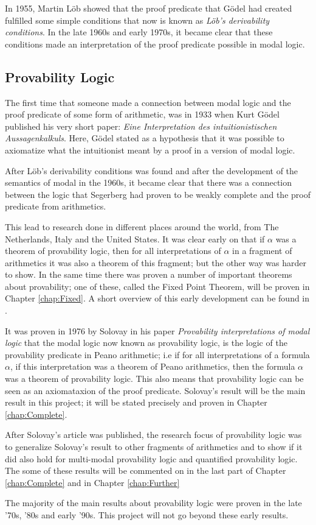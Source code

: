 \documentclass[../main.tex]{subfiles}
\begin{document}
In 1955, Martin Löb showed that the proof predicate that Gödel had created
fulfilled some simple conditions that now is known as \textit{Löb's derivability
conditions}. In the late 1960s and early 1970s, it became clear that these
conditions made an interpretation of the proof predicate possible in modal
logic.


\subsection{Provability Logic}
The first time that someone made a connection between modal logic and the proof
predicate of some form of arithmetic, was in 1933 when Kurt Gödel published his very short  paper:
\textit{Eine
Interpretation des intuitionistischen Aussagenkalkuls}. Here, Gödel
stated as a  hypothesis that it was possible to axiomatize what the
intuitionist meant by a proof in a version of modal logic.

After Löb's derivability conditions was found and after the development of the
semantics of modal in the 1960s, it became clear that there was a connection
between the logic that Segerberg had proven to be weakly complete and the proof
predicate from arithmetics.

This lead to research done in different places around the world, from The
Netherlands, Italy and the United States. It was clear early on that if
$\alpha$ was a theorem of provability logic, then for all interpretations of
$\alpha$ in a fragment of arithmetics it  was also a theorem of this fragment; but
the other way was harder to show. In the same time there was proven a number of
important theorems about provability; one of these, called the Fixed Point
Theorem,  will be proven in Chapter
\ref{chap:Fixed}.
A short overview of this early
development can be found in \parencite{Bool1991}.

It was proven in 1976 by Solovay in his paper \textit{Provability
interpretations of modal logic} that the modal
logic now known as provability logic, is the logic of the provability predicate
in Peano arithmetic; i.e if for all interpretations
of a formula $\alpha$, if this interpretation was a theorem of Peano
arithmetics,
then the formula $\alpha$ was a theorem of provability logic. This also means that
provability logic can be seen as an axiomataxion of the proof predicate.
Solovay's result will be the main result in this project; it will be stated
precisely and proven in Chapter \ref{chap:Complete}.



After Solovay's article was published, the research focus of provability logic
was to generalize Solovay's result to other fragments of arithmetics and to
show if 
it did also hold for multi-modal provability logic and quantified provability
logic. The some of these results will be commented on in the last part of
Chapter \ref{chap:Complete} and in Chapter \ref{chap:Further}

The majority of the main results about provability logic were proven in the late
'70s, '80s and early '90s. This project will not go beyond these early results.
\end{document}
